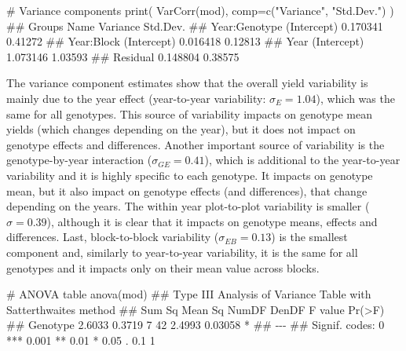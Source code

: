 \documentclass[a4paper,12pt,oneside]{book}
\newenvironment{Shaded}{\begin{snugshade}}{\end{snugshade}}
\newcommand{\StringTok}[1]{#1}
\newcommand{\CommentTok}[1]{#1}
\newcommand{\DocumentationTok}[1]{#1}
\newcommand{\FunctionTok}[1]{#1}
\newcommand{\AttributeTok}[1]{#1}
\newcommand{\NormalTok}[1]{#1}
\begin{document}
\begin{Shaded}
\begin{Highlighting}[]
\CommentTok{\# Variance components}
\FunctionTok{print}\NormalTok{( }\FunctionTok{VarCorr}\NormalTok{(mod), }\AttributeTok{comp=}\FunctionTok{c}\NormalTok{(}\StringTok{"Variance"}\NormalTok{, }\StringTok{"Std.Dev."}\NormalTok{) )}
\DocumentationTok{\#\#  Groups        Name        Variance Std.Dev.}
\DocumentationTok{\#\#  Year:Genotype (Intercept) 0.170341 0.41272 }
\DocumentationTok{\#\#  Year:Block    (Intercept) 0.016418 0.12813 }
\DocumentationTok{\#\#  Year          (Intercept) 1.073146 1.03593 }
\DocumentationTok{\#\#  Residual                  0.148804 0.38575}
\end{Highlighting}
\end{Shaded}

The variance component estimates show that the overall yield variability is mainly due to the year effect (year-to-year variability: \(\sigma_E = 1.04\)), which was the same for all genotypes. This source of variability impacts on genotype mean yields (which changes depending on the year), but it does not impact on genotype effects and differences. Another important source of variability is the genotype-by-year interaction (\(\sigma_{GE} = 0.41\)), which is additional to the year-to-year variability and it is highly specific to each genotype. It impacts on genotype mean, but it also impact on genotype effects (and differences), that change depending on the years. The within year plot-to-plot variability is smaller (\(\sigma = 0.39\)), although it is clear that it impacts on genotype means, effects and differences. Last, block-to-block variability (\(\sigma_{EB} = 0.13\)) is the smallest component and, similarly to year-to-year variability, it is the same for all genotypes and it impacts only on their mean value across blocks.

\begin{Shaded}
\begin{Highlighting}[]
\CommentTok{\# ANOVA table}
\FunctionTok{anova}\NormalTok{(mod)}
\DocumentationTok{\#\# Type III Analysis of Variance Table with Satterthwaite\textquotesingle{}s method}
\DocumentationTok{\#\#          Sum Sq Mean Sq NumDF DenDF F value  Pr(\textgreater{}F)  }
\DocumentationTok{\#\# Genotype 2.6033  0.3719     7    42  2.4993 0.03058 *}
\DocumentationTok{\#\# {-}{-}{-}}
\DocumentationTok{\#\# Signif. codes:  0 \textquotesingle{}***\textquotesingle{} 0.001 \textquotesingle{}**\textquotesingle{} 0.01 \textquotesingle{}*\textquotesingle{} 0.05 \textquotesingle{}.\textquotesingle{} 0.1 \textquotesingle{} \textquotesingle{} 1}
\end{Highlighting}
\end{Shaded}
\end{document}
